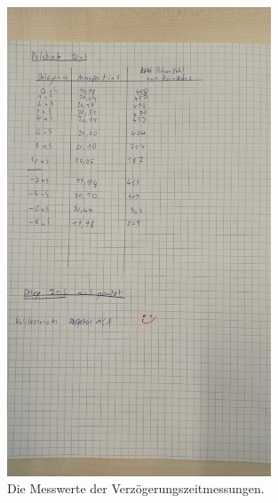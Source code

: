 \begin{figure}[h]
    \centering
    \includegraphics[width=0.7\textwidth]{latex/images/Messwerte_2.jpeg}
    \caption{Die Messwerte der Verzögerungszeitmessungen.}
    \label{img:mess2}
\end{figure}
  
